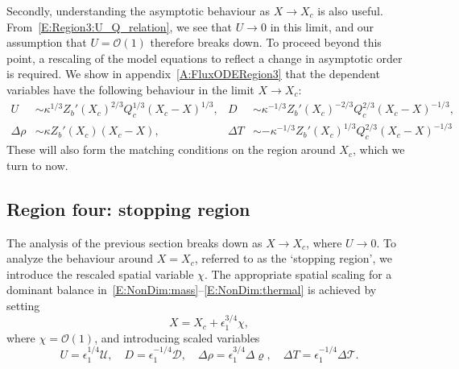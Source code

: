 \documentclass[openacc]{rsproca_new}%
\newcommand{\order}[1]{\mathcal{O}(#1)}
\newcommand{\red}[1]{{\color{red} #1}}
\newcommand{\epsone}{\epsilon_{1}} %
\begin{document}
Secondly, understanding the asymptotic behaviour as $X \to X_c$ is also useful. From~\eqref{E:Region3:U_Q_relation}, we see that $U \to 0$ in this limit, and our assumption that $U = \order{1}$ therefore breaks down. To proceed beyond this point, a rescaling of the model equations to reflect a change in asymptotic order is required. \red{We show in appendix~\ref{A:FluxODERegion3}} that the dependent variables have the following behaviour in the limit $X \to X_c$:
\begin{align}
U &\sim \kappa^{1/3} Z_b'(X_c)^{2/3} Q_c^{1/3}(X_c - X)^{1/3}, & D &\sim \kappa^{-1/3} Z_b'(X_c)^{-2/3} Q_c^{2/3}(X_c - X)^{-1/3},\label{E:Region3:X_to_Xc1}\\
\Delta \rho &\sim  \kappa Z_b'(X_c) (X_c - X), & \Delta T &\sim -\kappa^{-1/3} Z_b'(X_c)^{1/3} Q_c^{2/3}(X_c - X)^{-1/3}\label{E:Region3:X_to_Xc2}
\end{align}
These will also form the matching conditions on the region around $X_c$, which we turn to now.



\subsection{Region four: stopping region}\label{S:Asymptotics:Region4}
\newcommand{\U}{\mathcal{U}}
\newcommand{\D}{\mathcal{D}}
\newcommand{\p}{\Delta \varrho}
\renewcommand{\t}{\Delta \mathcal{T}}

The analysis of the previous section breaks down as $X \to X_c$, where $U \to 0$. To analyze the behaviour around $X = X_c$, referred to as the `stopping region', we introduce the rescaled spatial variable $\chi$. The appropriate spatial scaling for a dominant balance in~\eqref{E:NonDim:mass}--\eqref{E:NonDim:thermal} is achieved by setting 
\begin{equation}\label{E:Region4:X_scaling}
X = X_c + \epsone^{3/4}\chi,
\end{equation}
where $\chi = \order{1}$, and introducing scaled variables
\begin{equation}\label{E:Region4:var_scaling}
U = \epsone^{1/4}\U, \quad D = \epsone^{-1/4}\D, \quad \Delta \rho = \epsone^{3/4}\p, \quad  \Delta T = \epsone^{-1/4} \t.
\end{equation}
\end{document}
